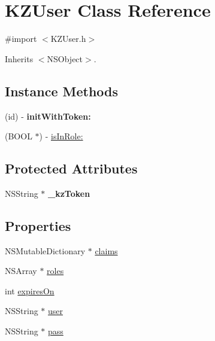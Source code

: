 \hypertarget{interface_k_z_user}{\section{K\-Z\-User Class Reference}
\label{interface_k_z_user}
}


{\ttfamily \#import $<$K\-Z\-User.\-h$>$}



Inherits $<$\-N\-S\-Object$>$.

\subsection*{Instance Methods}
\begin{DoxyCompactItemize}
\item 
\hypertarget{interface_k_z_user_a6d1bcceef0db0d4af5c38f4d4bd38ed6}{(id) -\/ {\bfseries init\-With\-Token\-:}}\label{interface_k_z_user_a6d1bcceef0db0d4af5c38f4d4bd38ed6}

\item 
(B\-O\-O\-L $\ast$) -\/ \hyperlink{interface_k_z_user_a722e77694f00dbce750119348c6884ba}{is\-In\-Role\-:}
\end{DoxyCompactItemize}
\subsection*{Protected Attributes}
\begin{DoxyCompactItemize}
\item 
\hypertarget{interface_k_z_user_ae27798741c2e4f58545b14232eaf16f7}{N\-S\-String $\ast$ {\bfseries \-\_\-kz\-Token}}\label{interface_k_z_user_ae27798741c2e4f58545b14232eaf16f7}

\end{DoxyCompactItemize}
\subsection*{Properties}
\begin{DoxyCompactItemize}
\item 
N\-S\-Mutable\-Dictionary $\ast$ \hyperlink{interface_k_z_user_a318bcfa5e1e27c031e963144c4d5182b}{claims}
\item 
N\-S\-Array $\ast$ \hyperlink{interface_k_z_user_aff87e2dff9f8d236f7fd04e6eec7e6b3}{roles}
\item 
int \hyperlink{interface_k_z_user_a297647adfd1901441e760c7509b5ccec}{expires\-On}
\item 
N\-S\-String $\ast$ \hyperlink{interface_k_z_user_a0b3b6896d3941d8e3e646c2f974ecec0}{user}
\item 
N\-S\-String $\ast$ \hyperlink{interface_k_z_user_a478bd400425d7301f092393e7d5257f0}{pass}
\end{DoxyCompactItemize}


